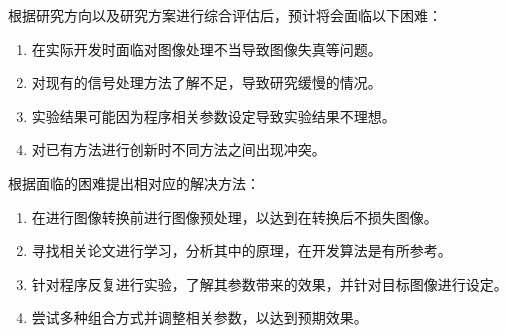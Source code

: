 
根据研究方向以及研究方案进行综合评估后，预计将会面临以下困难：
\begin{enumerate}[label=\arabic*)]
    \item 在实际开发时面临对图像处理不当导致图像失真等问题。
    \item 对现有的信号处理方法了解不足，导致研究缓慢的情况。
    \item 实验结果可能因为程序相关参数设定导致实验结果不理想。
    \item 对已有方法进行创新时不同方法之间出现冲突。
\end{enumerate}

\newpage

根据面临的困难提出相对应的解决方法：
\begin{enumerate}[label=\arabic*)]
    \item 在进行图像转换前进行图像预处理，以达到在转换后不损失图像。
    \item 寻找相关论文进行学习，分析其中的原理，在开发算法是有所参考。
    \item 针对程序反复进行实验，了解其参数带来的效果，并针对目标图像进行设定。
    \item 尝试多种组合方式并调整相关参数，以达到预期效果。
\end{enumerate}